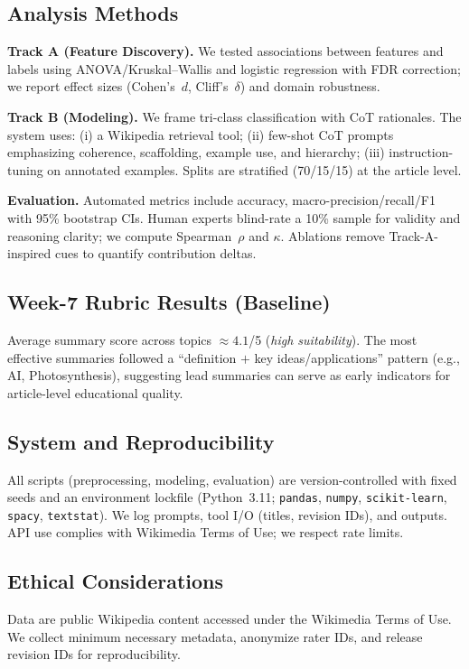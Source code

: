 \subsection{Analysis Methods}
\textbf{Track A (Feature Discovery).} We tested associations between features and labels using ANOVA/Kruskal–Wallis and logistic regression with FDR correction; we report effect sizes (Cohen’s~$d$, Cliff’s~$\delta$) and domain robustness.

\textbf{Track B (Modeling).} We frame tri-class classification with CoT rationales. The system uses: (i) a Wikipedia retrieval tool; (ii) few-shot CoT prompts emphasizing coherence, scaffolding, example use, and hierarchy; (iii) instruction-tuning on annotated examples. Splits are stratified (70/15/15) at the article level.

\textbf{Evaluation.} Automated metrics include accuracy, macro-precision/recall/F1 with 95\% bootstrap CIs. Human experts blind-rate a 10\% sample for validity and reasoning clarity; we compute Spearman~$\rho$ and $\kappa$. Ablations remove Track-A-inspired cues to quantify contribution deltas.

\subsection{Week-7 Rubric Results (Baseline)}
Average summary score across topics $\approx 4.1$/5 (\emph{high suitability}). The most effective summaries followed a “definition $+$ key ideas/applications” pattern (e.g., AI, Photosynthesis), suggesting lead summaries can serve as early indicators for article-level educational quality.

\subsection{System and Reproducibility}
All scripts (preprocessing, modeling, evaluation) are version-controlled with fixed seeds and an environment lockfile (Python~3.11; \texttt{pandas}, \texttt{numpy}, \texttt{scikit-learn}, \texttt{spacy}, \texttt{textstat}). We log prompts, tool I/O (titles, revision IDs), and outputs. API use complies with Wikimedia Terms of Use; we respect rate limits.

\subsection{Ethical Considerations}
Data are public Wikipedia content accessed under the Wikimedia Terms of Use. We collect minimum necessary metadata, anonymize rater IDs, and release revision IDs for reproducibility.

